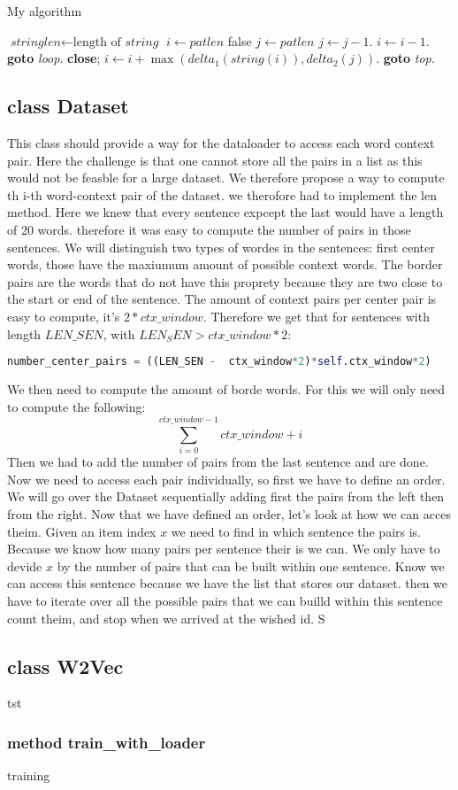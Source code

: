 \begin{algorithm}
\caption{My algorithm}\label{euclid}
\begin{algorithmic}[1]
\State $\textit{stringlen} \gets \text{length of }\textit{string}$
\State $i \gets \textit{patlen}$
 \Return false
\EndIf
\State $j \gets \textit{patlen}$
\State $j \gets j-1$.
\State $i \gets i-1$.
\State \textbf{goto} \emph{loop}.
\State \textbf{close};
\EndIf
\State $i \gets i+\max(\textit{delta}_1(\textit{string}(i)),\textit{delta}_2(j))$.
\State \textbf{goto} \emph{top}.
\EndProcedure
\end{algorithmic}
\end{algorithm}
\subsection{class Dataset}
This class should provide a way for the dataloader to access each word context pair. Here the challenge is that one cannot store all the pairs in a list as this would not be feasble for a large dataset. We therefore propose a way to compute th i-th word-context pair of the dataset. we therofore had to implement the len method. Here we knew that every sentence expcept the last would have a length of 20 words. therefore it was easy to compute the number of pairs in those sentences.
We will distinguish two types of wordes in the sentences: first center words, those have the maxiumum amount of possible context words. The border pairs are the words that do not have this proprety because they are two close to the start or end of the sentence. The amount of context pairs per center pair is easy to compute, it's $2*ctx\_window$. Therefore we get that for sentences with length $LEN\_SEN$, with $LEN_SEN  > ctx\_window*2$:
\begin{lstlisting}[language=python]
number_center_pairs = ((LEN_SEN -  ctx_window*2)*self.ctx_window*2)
\end{lstlisting}
We then need to compute the amount of borde words. For this we will only need to compute the following:
\begin{equation}
\sum_{i=0}^{ctx\_window -1} ctx\_window + i
\end{equation}
 Then we had to add the number of pairs from the last sentence and are done. 
Now we need to access each pair individually, so first we have to define an order. We will go over the Dataset sequentially adding first the pairs from the left then from the right. Now that we have defined an order, let's look at how we can acces theim. Given an item index $x$ we need to find in which sentence the pairs is. Because we know how many pairs per sentence their is we can. We only have to devide $x$ by the number of pairs that can be built within one sentence. Know we can access this sentence because we have the list that stores our dataset. then we have to iterate over all the possible pairs that we can builld within this sentence count theim, and stop when we arrived at the wished id. S

\subsection{class W2Vec}
tst
\subsubsection{method train\_with\_loader}
training

